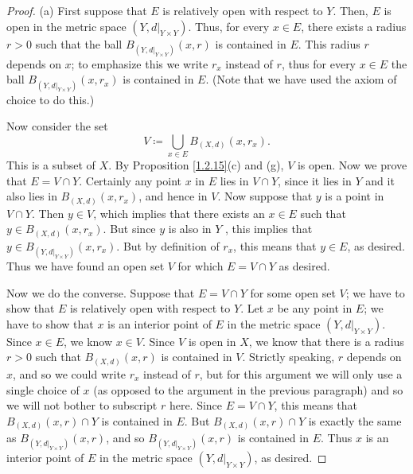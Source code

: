 \begin{proof}{(a)}
    First suppose that \(E\) is relatively open with respect to \(Y\).
    Then, \(E\) is open in the metric space \((Y, d|_{Y \times Y})\).
    Thus, for every \(x \in E\), there exists a radius \(r > 0\) such that the ball \(B_{(Y, d|_{Y \times Y})}(x, r)\) is contained in \(E\).
    This radius \(r\) depends on \(x\);
    to emphasize this we write \(r_x\) instead of \(r\), thus for every \(x \in E\) the ball \(B_{(Y, d|_{Y \times Y})}(x, r_x)\) is contained in \(E\).
    (Note that we have used the axiom of choice to do this.)

    Now consider the set
    \[
        V \coloneqq \bigcup_{x \in E} B_{(X, d)}(x, r_x).
    \]
    This is a subset of \(X\).
    By Proposition \ref{1.2.15}(c) and (g), \(V\) is open.
    Now we prove that \(E = V \cap Y\).
    Certainly any point \(x\) in \(E\) lies in \(V \cap Y\), since it lies in \(Y\) and it also lies in \(B_{(X, d)}(x, r_x)\), and hence in \(V\).
    Now suppose that \(y\) is a point in \(V \cap Y\).
    Then \(y \in V\), which implies that there exists an \(x \in E\) such that \(y \in B_{(X, d)}(x, r_x)\).
    But since \(y\) is also in \(Y\) , this implies that \(y \in B_{(Y, d|_{Y \times Y})}(x, r_x)\).
    But by definition of \(r_x\), this means that \(y \in E\), as desired.
    Thus we have found an open set \(V\) for which \(E = V \cap Y\) as desired.

    Now we do the converse.
    Suppose that \(E = V \cap Y\) for some open set \(V\);
    we have to show that \(E\) is relatively open with respect to \(Y\).
    Let \(x\) be any point in \(E\);
    we have to show that \(x\) is an interior point of \(E\) in the metric space \((Y, d|_{Y \times Y})\).
    Since \(x \in E\), we know \(x \in V\).
    Since \(V\) is open in \(X\), we know that there is a radius \(r > 0\) such that \(B_{(X, d)}(x, r)\) is contained in \(V\).
    Strictly speaking, \(r\) depends on \(x\), and so we could write \(r_x\) instead of \(r\), but for this argument we will only use a single choice of \(x\) (as opposed to the argument in the previous paragraph) and so we will not bother to subscript \(r\) here.
    Since \(E = V \cap Y\), this means that \(B_{(X, d)}(x, r) \cap Y\) is contained in \(E\).
    But \(B_{(X, d)}(x, r) \cap Y\) is exactly the same as \(B_{(Y, d|_{Y \times Y})}(x, r)\), and so \(B_{(Y, d|_{Y \times Y})}(x, r)\) is contained in \(E\).
    Thus \(x\) is an interior point of \(E\) in the metric space \((Y, d|_{Y \times Y})\), as desired.
\end{proof}
